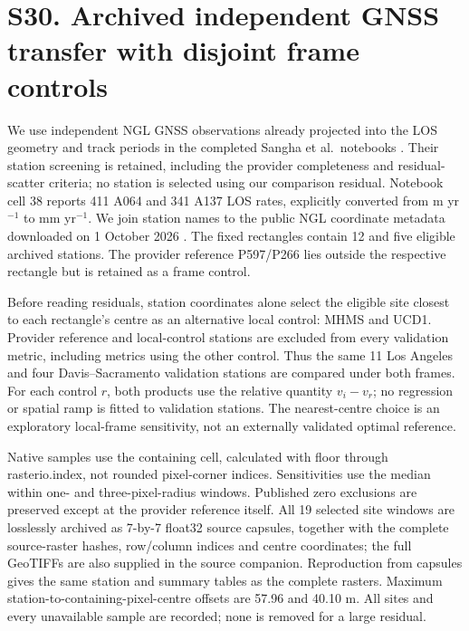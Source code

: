 \section*{S30. Archived independent GNSS transfer with disjoint frame controls}
We use independent NGL GNSS observations already projected into the LOS geometry and track periods in the completed Sangha et al.\ notebooks \citep{sangha2026california,sangha2026data}. Their station screening is retained, including the provider completeness and residual-scatter criteria; no station is selected using our comparison residual. Notebook cell 38 reports 411 A064 and 341 A137 LOS rates, explicitly converted from m yr$^{-1}$ to mm yr$^{-1}$. We join station names to the public NGL coordinate metadata downloaded on 1 October 2026 \citep{ngl2026holdings}. The fixed rectangles contain 12 and five eligible archived stations. The provider reference P597/P266 lies outside the respective rectangle but is retained as a frame control.

Before reading residuals, station coordinates alone select the eligible site closest to each rectangle's centre as an alternative local control: MHMS and UCD1. Provider reference and local-control stations are excluded from every validation metric, including metrics using the other control. Thus the same 11 Los Angeles and four Davis--Sacramento validation stations are compared under both frames. For each control $r$, both products use the relative quantity $v_i-v_r$; no regression or spatial ramp is fitted to validation stations. The nearest-centre choice is an exploratory local-frame sensitivity, not an externally validated optimal reference.

Native samples use the containing cell, calculated with floor through rasterio.index, not rounded pixel-corner indices. Sensitivities use the median within one- and three-pixel-radius windows. Published zero exclusions are preserved except at the provider reference itself. All 19 selected site windows are losslessly archived as 7-by-7 float32 source capsules, together with the complete source-raster hashes, row/column indices and centre coordinates; the full GeoTIFFs are also supplied in the source companion. Reproduction from capsules gives the same station and summary tables as the complete rasters. Maximum station-to-containing-pixel-centre offsets are 57.96 and 40.10 m. All sites and every unavailable sample are recorded; none is removed for a large residual.


